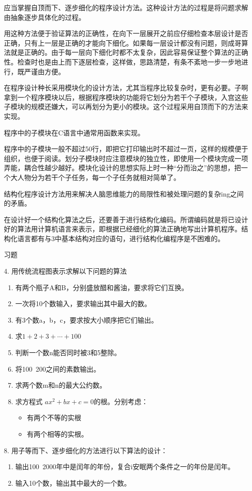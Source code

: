 应当掌握自顶而下、逐步细化的程序设计方法。这种设计方法的过程是将问题求解由抽象逐步具体化的过程。

用这种方法便于验证算法的正确性，在向下一层展开之前应仔细检查本层设计是否正确，只有上一层是正确的才能向下细化。如果每一层设计都没有问题，则成哥算法就是正确的。由于每一层向下细化时都不太复杂，因此容易保证整个算法的正确性。检查时也是由上而下逐层检查，这样做，思路清楚，有条不紊地一步一步地进行，既严谨由方便。

在程序设计种长采用模块化的设计方法，尤其当程序比较复杂时，更有必要。子啊拿到一个程序模块以后，根据程序模块的功能将它划分为若干个子模块，入宫这些子模块的规模还嫌大，可以再划分为更小的模块。这个过程采用自顶而下的方法来实现。

程序中的子模块在C语言中通常用函数来实现。

程序中的子模块一般不超过50行，即把它打印输出时不超过一页，这样的规模便于组织，也便于阅读。划分子模块时应注意模块的独立性，即使用一个模块完成一项弄能，耦合性越少越好。模块化设计的思想实际上时一种“分而治之”的思想，把一个大人物分为若干个子任务，每一个子任务就相对简单了。

结构化程序设计方法用来解决人脑思维能力的局限性和被处理问题的复杂ing之间的矛盾。

在设计好一个结构化算法之后，还要善于进行结构化编码。所谓编码就是将已设计好的算法用计算机语言来表示，即根据已经细化的算法正确地写出计算机程序。结构化语言都有与3中基本结构对应的语句，进行结构化编程序是不困难的。

习题

4. 用传统流程图表示求解以下问题的算法
\begin{enumerate}
	\item 有两个瓶子A和B，分别盛放醋和酱油，要求将它们互换。
	\item 一次将10个数输入，要求输出其中最大的数。
	\item 有3个数a，b，c，要求按大小顺序把它们输出。
	\item 求$1 + 2 + 3 + \cdots + 100$
	\item 判断一个数n能否同时被3和5整除。
	\item 将100~200之间的素数输出。
	\item 求两个数m和n的最大公约数。
	\item 求方程式 $ax^2 + bx + c = 0$的根。分别考虑：
		\begin{itemize}
			\item 有两个不等的实根
			\item 有两个相等的实根。
		\end{itemize}
\end{enumerate}
8. 用子等而下、逐步细化的方法进行以下算法的设计：
\begin{enumerate}
	\item 输出100~2000年中是闰年的年份，复合i安眠两个条件之一的年份是闰年。
	\item 输入10个数，输出其中最大的一个数。
\end{enumerate}

